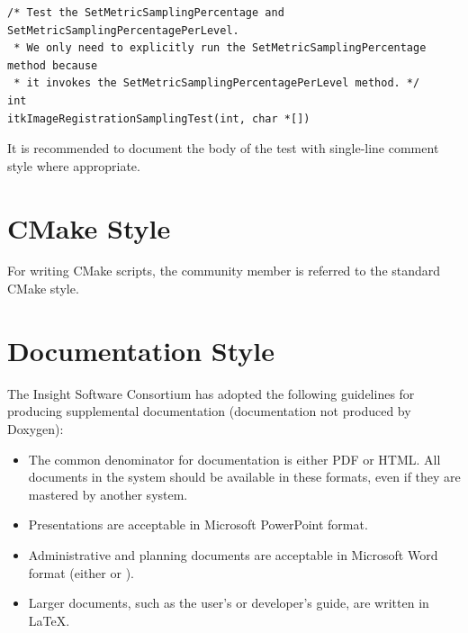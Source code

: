 \small
\begin{verbatim}
/* Test the SetMetricSamplingPercentage and SetMetricSamplingPercentagePerLevel.
 * We only need to explicitly run the SetMetricSamplingPercentage method because
 * it invokes the SetMetricSamplingPercentagePerLevel method. */
int
itkImageRegistrationSamplingTest(int, char *[])
\end{verbatim}
\normalsize

It is recommended to document the body of the test with single-line comment
style where appropriate.


\section{CMake Style}%
\label{sec:CMakeStyle}

For writing CMake scripts, the community member is referred to the standard
CMake style.


\section{Documentation Style}%
\label{sec:DocumentationStyle}

The Insight Software Consortium has adopted the following guidelines for
producing supplemental documentation (documentation not produced by Doxygen):
\begin{itemize}
\item The common denominator for documentation is either PDF or HTML. All
documents in the system should be available in these formats, even if they are
mastered by another system.
\item Presentations are acceptable in Microsoft PowerPoint format.
\item Administrative and planning documents are acceptable in Microsoft Word
format (either  or ).
\item Larger documents, such as the user's or developer's guide, are written in
\LaTeX.
\end{itemize}
